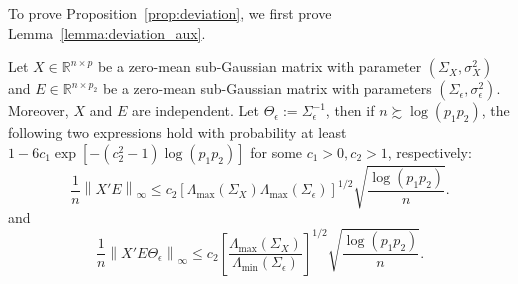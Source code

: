 \medskip

To prove Proposition~\ref{prop:deviation}, we first prove Lemma~\ref{lemma:deviation_aux}.

\begin{lemma}\label{lemma:deviation_aux}
Let $X\in\mathbb{R}^{n\times p}$ be a zero-mean sub-Gaussian matrix with parameter $(\Sigma_X,\sigma_X^2)$ and $E\in\mathbb{R}^{n\times p_2}$ be a zero-mean sub-Gaussian matrix with parameters $(\Sigma_\epsilon,\sigma^2_\epsilon)$. Moreover, $X$ and $E$ are independent. Let $\Theta_\epsilon:=\Sigma_\epsilon^{-1}$, then if $n\succsim \log (p_1p_2)$, the following two expressions hold with probability at least $1-6c_1\exp[-(c_2^2-1)\log (p_1p_2)]$ for some $c_1>0,c_2>1$, respectively:
\begin{equation}\label{deviation_aux-1}
\frac{1}{n}\left\|X'E\right\|_\infty \leq c_2\left[\Lambda_{\max}(\Sigma_X)\Lambda_{\max}(\Sigma_\epsilon)\right]^{1/2} \sqrt{\frac{\log (p_1p_2) }{n}}.
\end{equation}
and
\begin{equation}\label{deviation_aux-2}
\frac{1}{n}\left\| X'E\Theta_\epsilon\right\|_\infty \leq c_2\left[\frac{\Lambda_{\max}(\Sigma_X)}{\Lambda_{\min}(\Sigma_\epsilon)}\right]^{1/2} \sqrt{\frac{\log (p_1p_2) }{n}}.
\end{equation}
\end{lemma}

